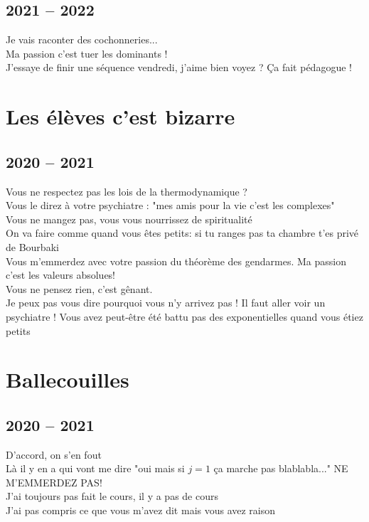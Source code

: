 \documentclass[french, a4paper, openany]{book}
\begin{document}
\section{2021 -- 2022}

	\noindent \og Je vais raconter des cochonneries... \fg \\
	\og Ma passion c'est tuer les dominants ! \fg \\
	\og J'essaye de finir une séquence vendredi, j'aime bien voyez ? Ça fait pédagogue ! \fg \\

\chapter{Les élèves c'est bizarre}

\section{2020 -- 2021}

	\noindent \og Vous ne respectez pas les lois de la thermodynamique ? \fg \\
	\og Vous le direz à votre psychiatre : "mes amis pour la vie c'est les complexes" \fg \\
	\og Vous ne mangez pas, vous vous nourrissez de spiritualité \fg \\
	\og On va faire comme quand vous êtes petits: si tu ranges pas ta chambre t'es privé de Bourbaki \fg \\
	\og Vous m'emmerdez avec votre passion du théorème des gendarmes. Ma passion c'est les valeurs absolues! \fg \\
	\og Vous ne pensez rien, c'est gênant. \fg \\
	\og Je peux pas vous dire pourquoi vous n'y arrivez pas ! Il faut aller voir un psychiatre ! Vous avez peut-être été battu pas des exponentielles quand vous étiez petits \fg \\
 
\chapter{Ballecouilles}

\section{2020 -- 2021}
 
	\noindent \og D'accord, on s'en fout \fg \\
	\og Là il y en a qui vont me dire "oui mais si $j = 1$ ça marche pas blablabla..." NE M'EMMERDEZ PAS! \fg \\
	\og J'ai toujours pas fait le cours, il y a pas de cours \fg \\
	\og J'ai pas compris ce que vous m'avez dit mais vous avez raison \fg \\
\end{document}
